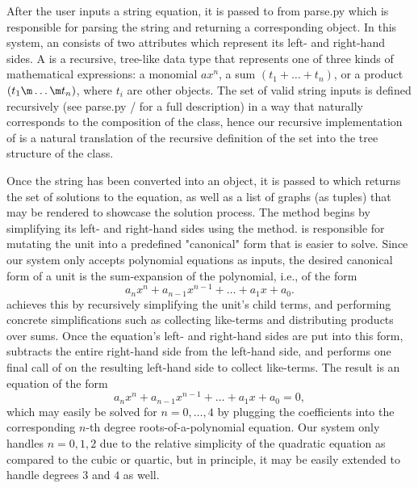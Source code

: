 \documentclass[11pt]{article}
\begin{document}
After the user inputs a string equation, it is passed to  from parse.py which is responsible for parsing the string and returning a corresponding  object. In this system, an  consists of two  attributes which represent its left- and right-hand sides. A  is a recursive, tree-like data type that represents one of three kinds of mathematical expressions: a monomial $ax^n$, a sum $(t_1 + \dots + t_n)$, or a product $(t_1 \m \dots \m t_n)$, where $t_i$ are other  objects. The set of valid string inputs is defined recursively (see parse.py /  for a full description) in a way that naturally corresponds to the composition of the  class, hence our recursive implementation of  is a natural translation of the recursive definition of the set into the tree structure of the  class.

Once the string has been converted into an  object, it is passed to  which returns the set of solutions to the equation, as well as a list of graphs (as tuples) that may be rendered to showcase the solution process. The  method begins by simplifying its left- and right-hand sides using the  method.  is responsible for mutating the unit into a predefined "canonical" form that is easier to solve. Since our system only accepts polynomial equations as inputs, the desired canonical form of a unit is the sum-expansion of the polynomial, i.e., of the form
\[a_n x^n + a_{n-1} x^{n-1} + \dots + a_1 x + a_0.\]
 achieves this by recursively simplifying the unit's child terms, and performing concrete simplifications such as collecting like-terms and distributing products over sums. Once the equation's left- and right-hand sides are put into this form,  subtracts the entire right-hand side from the left-hand side, and performs one final call of  on the resulting left-hand side to collect like-terms. The result is an equation of the form
\[a_n x^n + a_{n-1} x^{n-1} + \dots + a_1 x + a_0 = 0,\]
which may easily be solved for $n = 0, \dots, 4$ by plugging the coefficients into the corresponding $n$-th degree roots-of-a-polynomial equation. Our system only handles $n = 0, 1, 2$ due to the relative simplicity of the quadratic equation as compared to the cubic or quartic, but in principle, it may be easily extended to handle degrees $3$ and $4$ as well.
\end{document}
